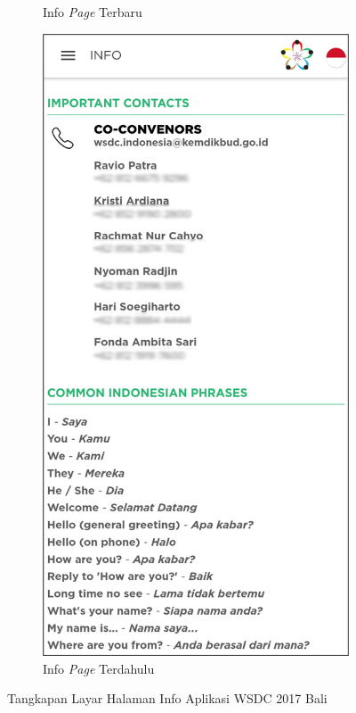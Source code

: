 \begin{figure}[H]
\begin{subfigure}[b]{0.3\textwidth}
         \caption{Info \textit{Page} Terbaru}
         \label{fig:ssInfo}
     \end{subfigure}
     \hspace*{0.5in}
     \begin{subfigure}[b]{0.3\textwidth}
         \centering
         \includegraphics[width=\textwidth]{Gambar/InfoPage.png}
         \caption{Info \textit{Page} Terdahulu}
         \label{fig:ssInfoOld}
     \end{subfigure}
        \caption{Tangkapan Layar Halaman Info Aplikasi WSDC 2017 Bali}
        \label{fig:ssApk1}
\end{figure}


